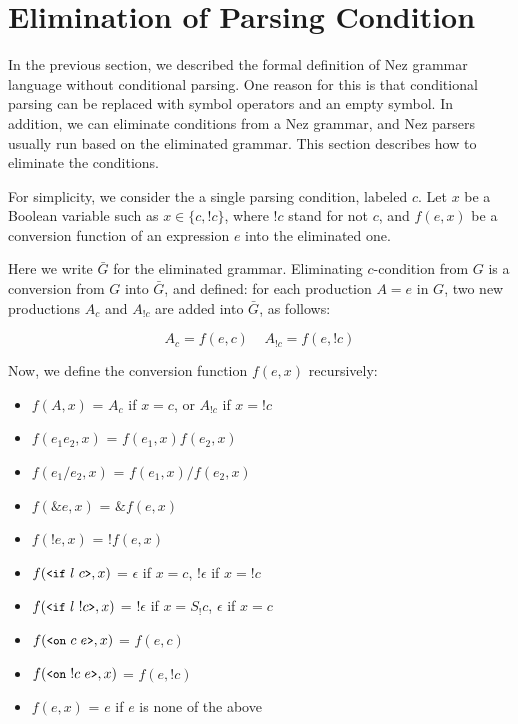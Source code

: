 \documentclass[preprint]{sigplanconf}
\begin{document}
\section{Elimination of Parsing Condition} \label{sec:condition}



In the previous section, we described the formal definition of Nez grammar language without conditional parsing. One reason for this is that conditional parsing can be replaced with symbol operators and an empty symbol.  In addition, we can eliminate conditions from a Nez grammar, and Nez parsers usually run based on the eliminated grammar. This section describes how to eliminate the conditions.

For simplicity, we consider the a single parsing condition, labeled $c$. Let $x$ be a Boolean variable such as $x \in \{c, !c\}$, where $!c$ stand for not $c$, and $f(e, x)$ be a conversion function of an expression $e$ into the eliminated one. 

Here we write $\bar{G}$ for the eliminated grammar. Eliminating $c$-condition from $G$ is a conversion from $G$ into $\bar{G}$, and defined: for each production $A=e$ in $G$, two new productions $A_c$ and $A_{!c}$ are added into $\bar{G}$, as follows:

\[
A_c = f(e, c) ~~~~~ A_{!c} = f(e, !c)
\]

Now, we define the conversion function $f(e, x)$ recursively:

\begin{itemize}
\item $f(A,x)$ = $A_c$ if $x = c$, or $A_{!c}$ if $x = !c$
\item $f(e_1 e_2, x)$ = $f(e_1,x)  f(e_2,x)$
\item $f(e_1 / e_2,x)$ = $f(e_1,x) /  f(e_2,x)$
\item $f(\&e,x)$ = $\&f(e,x)$
\item $f(!e,x)$ = $! f(e,x)$
\item $f({\small \verb|<if|~ l ~ c \verb|>|},x)$ = $\epsilon$ if $x = c$, $!\epsilon$ if $x = !c$
\item $f({\small \verb|<if|~ l ~ !c \verb|>|},x)$ = $!\epsilon$ if $x = S_!c$, $\epsilon$ if $x = c$
\item $f({\small \verb|<on|~ c ~ e \verb|>|}, x)$ = $f(e, c)$
\item $f({\small \verb|<on|~ !c ~ e \verb|>|}, x)$ = $f(e, !c)$ 
\item $f(e, x)$ = $e$ if $e$ is none of the above
\end{itemize}
\end{document}
